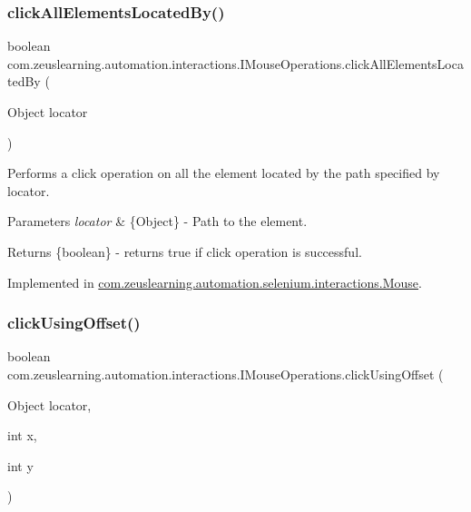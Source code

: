 \subsubsection{\texorpdfstring{click\+All\+Elements\+Located\+By()}{clickAllElementsLocatedBy()}}
{\footnotesize\ttfamily boolean com.\+zeuslearning.\+automation.\+interactions.\+I\+Mouse\+Operations.\+click\+All\+Elements\+Located\+By (\begin{DoxyParamCaption}\item[{Object}]{locator }\end{DoxyParamCaption})}

Performs a click operation on all the element located by the path specified by {\ttfamily locator}.


\begin{DoxyParams}{Parameters}
{\em locator} & \{Object\} -\/ Path to the element.\\
\hline
\end{DoxyParams}
\begin{DoxyReturn}{Returns}
\{boolean\} -\/ returns {\ttfamily true} if click operation is successful. 
\end{DoxyReturn}


Implemented in \hyperlink{classcom_1_1zeuslearning_1_1automation_1_1selenium_1_1interactions_1_1Mouse_af29d27d7e5e67708d7b55c955fd873e9}{com.\+zeuslearning.\+automation.\+selenium.\+interactions.\+Mouse}.

\hypertarget{interfacecom_1_1zeuslearning_1_1automation_1_1interactions_1_1IMouseOperations_a76821e7ed6d7ca57f9466546e80a1679}{}\label{interfacecom_1_1zeuslearning_1_1automation_1_1interactions_1_1IMouseOperations_a76821e7ed6d7ca57f9466546e80a1679} 
\subsubsection{\texorpdfstring{click\+Using\+Offset()}{clickUsingOffset()}}
{\footnotesize\ttfamily boolean com.\+zeuslearning.\+automation.\+interactions.\+I\+Mouse\+Operations.\+click\+Using\+Offset (\begin{DoxyParamCaption}\item[{Object}]{locator,  }\item[{int}]{x,  }\item[{int}]{y }\end{DoxyParamCaption})}

